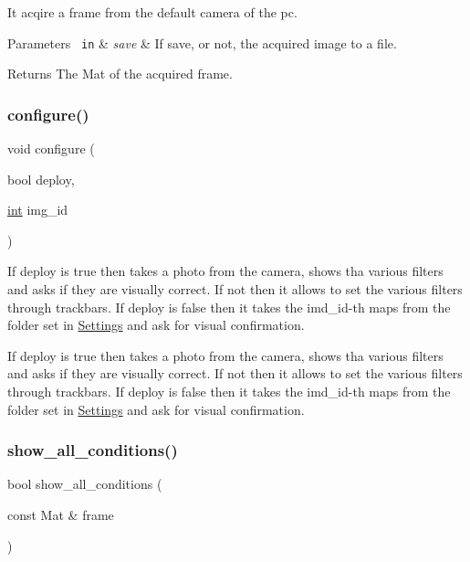 It acqire a frame from the default camera of the pc. 


\begin{DoxyParams}[1]{Parameters}
\mbox{\texttt{ in}}  & {\em save} & If save, or not, the acquired image to a file. \\
\hline
\end{DoxyParams}
\begin{DoxyReturn}{Returns}
The Mat of the acquired frame. 
\end{DoxyReturn}
\mbox{\label{configure_8hh_afff3976a7e359f9c2baef0fa59f0fca0}} 
\subsubsection{\texorpdfstring{configure()}{configure()}}
{\footnotesize\ttfamily void configure (\begin{DoxyParamCaption}\item[{bool}]{deploy,  }\item[{\mbox{\hyperlink{draw_8hh_aa620a13339ac3a1177c86edc549fda9b}{int}}}]{img\+\_\+id }\end{DoxyParamCaption})}



If deploy is true then takes a photo from the camera, shows tha various filters and asks if they are visually correct. If not then it allows to set the various filters through trackbars. If deploy is false then it takes the imd\+\_\+id-\/th maps from the folder set in \mbox{\hyperlink{class_settings}{Settings}} and ask for visual confirmation. 

If deploy is true then takes a photo from the camera, shows tha various filters and asks if they are visually correct. If not then it allows to set the various filters through trackbars. If deploy is false then it takes the imd\+\_\+id-\/th maps from the folder set in \mbox{\hyperlink{class_settings}{Settings}} and ask for visual confirmation. \mbox{\label{configure_8hh_a7a820e1422cbd41bba0662593fed05d8}} 
\subsubsection{\texorpdfstring{show\_all\_conditions()}{show\_all\_conditions()}}
{\footnotesize\ttfamily bool show\+\_\+all\+\_\+conditions (\begin{DoxyParamCaption}\item[{const Mat \&}]{frame }\end{DoxyParamCaption})}

